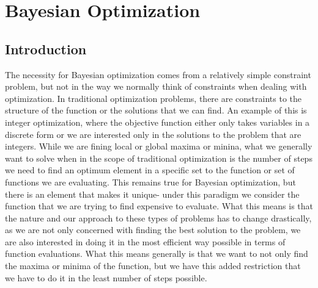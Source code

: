 \chapter{Bayesian Optimization}

\section{Introduction}

The necessity for Bayesian optimization comes from a relatively simple constraint problem, but not in the way we normally think of constraints when dealing with optimization. In traditional optimization problems, there are constraints to the structure of the function or the solutions that we can find. An example of this is integer optimization, where the objective function either only takes variables in a discrete form or we are interested only in the solutions to the problem that are integers. While we are fining local or global maxima or minina, what we generally want to solve when in the scope of traditional optimization is the number of steps we need to find an optimum element in a specific set to the function or set of functions we are evaluating. This remains true for Bayesian optimization, but there is an element that makes it unique- under this paradigm we consider the function that we are trying to find expensive to evaluate. What this means is that the nature and our approach to these types of problems has to change drastically, as we are not only concerned with finding the best solution to the problem, we are also interested in doing it in the most efficient way possible in terms of function evaluations. What this means generally is that we want to not only find the maxima or minima of the function, but we have this added restriction that we have to do it in the least number of steps possible. 

